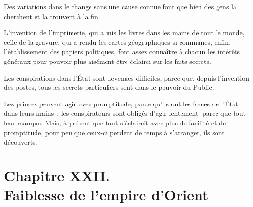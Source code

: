 \documentclass[french,twoside]{book} %
\newcommand\chapteropen{} %
\newcommand\chapterclose{} %
\begin{document}
Des variations dans le change sans une cause connue font que bien des gens la cherchent et la trouvent à la fin.\par
L’invention de l’imprimerie, qui a mis les livres dans les mains de tout le monde, celle de la gravure, qui a rendu les cartes géographiques si communes, enfin, l’établissement des papiers politiques, font assez connaître à chacun les intérêts généraux pour pouvoir plus aisément être éclairci sur les faits secrets.\par
Les conspirations dans l’État sont devenues difficiles, parce que, depuis l’invention des postes, tous les secrets particuliers sont dans le pouvoir du Public.\par
Les princes peuvent agir avec promptitude, parce qu’ils ont les forces de l’État dans leurs mains ; les conspirateurs sont obligés d’agir lentement, parce que tout leur manque. Mais, à présent que tout s’éclaircit avec plus de facilité et de promptitude, pour peu que ceux-ci perdent de temps à s’arranger, ils sont découverts.
\chapterclose


\chapteropen
\chapter[{Chapitre XXII. Faiblesse de l’empire d’Orient}]{Chapitre XXII. \\
Faiblesse de l’empire d’Orient}
\label{considérations\_Romains\_chap\_22}\renewcommand{\leftmark}{Chapitre XXII. \\
Faiblesse de l’empire d’Orient}
\end{document}
